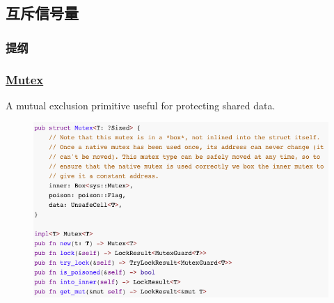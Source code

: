 \subsection{互斥信号量} %
\begin{frame}
\frametitle{提纲} %
\tableofcontents %
\end{frame}
\begin{frame}[fragile]
    \frametitle{\href{https://doc.rust-lang.org/std/sync/struct.Mutex.html}{Mutex}}

A mutual exclusion primitive useful for protecting shared data. \pause

    \begin{figure}
    \includegraphics[width=0.7\linewidth]{figs/struct-mutex.png}
    \end{figure}

\end{frame}
% 
% 
% 
